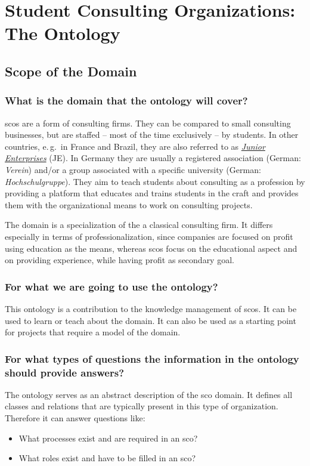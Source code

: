 \documentclass[a4paper, DIV=13, BCOR=0cm]{scrbook}
\newcommand{\eg}{e.\,g.\ }
\begin{document}
\chapter{Student Consulting Organizations: The Ontology }
\section{Scope of the Domain }
\label{competency-questions}
\subsection{What is the domain that the ontology will cover? }
\glspl{sco} are a form of consulting firms.  They can be compared to small consulting businesses, but are staffed -- most of the time exclusively -- by students. In other countries, \eg in France and Brazil, they are also referred to as \href{https://en.wikipedia.org/wiki/Junior_enterprise}{\textit{Junior Enterprises}} (JE). In Germany they are usually a registered association (German: \textit{Verein}) and/or a group associated with a specific university (German: \textit{Hochschulgruppe}). They aim to teach students about consulting as a profession by providing a platform that educates and trains students in the craft and provides them with the organizational means to work on consulting projects.

The domain is a specialization of the a classical consulting firm. It differs especially in terms of professionalization, since companies are focused on profit using education as the means, whereas \glspl{sco} focus on the educational aspect and on providing experience, while having profit as secondary goal.

\subsection{For what we are going to use the ontology? }
This ontology is a contribution to the knowledge management of \glspl{sco}. It can be used to learn or teach about the domain. It can also be used as a starting point for projects that require a model of the domain.

\subsection{For what types of questions the information in the ontology should provide answers? }
The ontology serves as an abstract description of the \gls{sco} domain. It defines all classes and relations that are typically present in this type of organization. Therefore it can answer questions like:
\begin{itemize}
	\item What processes exist and are required in an \gls{sco}?
	\item What roles exist and have to be filled in an \gls{sco}?
\end{itemize}
\end{document}
